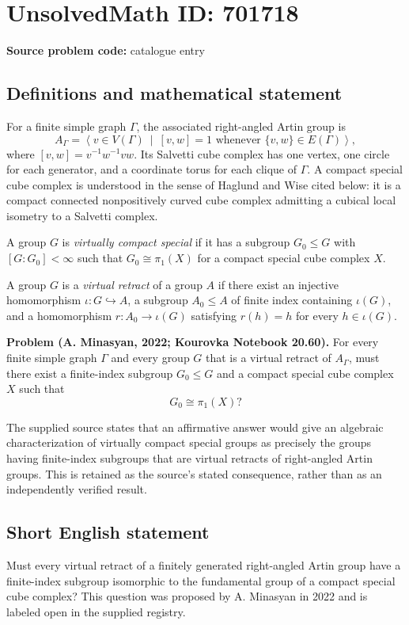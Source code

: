 \documentclass[11pt]{article}
\begin{document}
\section*{UnsolvedMath ID: 701718}
\textbf{Source problem code:} catalogue entry
\subsection{Definitions and mathematical statement}
For a finite simple graph \(\Gamma\), the associated right-angled Artin group is
\[
A_\Gamma=\left\langle v\in V(\Gamma)\ \middle|\ [v,w]=1\text{ whenever }\{v,w\}\in E(\Gamma)\right\rangle,
\]
where \([v,w]=v^{-1}w^{-1}vw\). Its Salvetti cube complex has one vertex, one circle for each generator, and a coordinate torus for each clique of \(\Gamma\). A compact special cube complex is understood in the sense of Haglund and Wise cited below: it is a compact connected nonpositively curved cube complex admitting a cubical local isometry to a Salvetti complex.

A group \(G\) is \emph{virtually compact special} if it has a subgroup \(G_0\leq G\) with \([G:G_0]<\infty\) such that \(G_0\cong\pi_1(X)\) for a compact special cube complex \(X\).

A group \(G\) is a \emph{virtual retract} of a group \(A\) if there exist an injective homomorphism \(\iota:G\hookrightarrow A\), a subgroup \(A_0\leq A\) of finite index containing \(\iota(G)\), and a homomorphism \(r:A_0\to\iota(G)\) satisfying \(r(h)=h\) for every \(h\in\iota(G)\).

\textbf{Problem (A. Minasyan, 2022; Kourovka Notebook 20.60).} For every finite simple graph \(\Gamma\) and every group \(G\) that is a virtual retract of \(A_\Gamma\), must there exist a finite-index subgroup \(G_0\leq G\) and a compact special cube complex \(X\) such that
\[
G_0\cong\pi_1(X)?
\]

The supplied source states that an affirmative answer would give an algebraic characterization of virtually compact special groups as precisely the groups having finite-index subgroups that are virtual retracts of right-angled Artin groups. This is retained as the source's stated consequence, rather than as an independently verified result.
\subsection{Short English statement}
Must every virtual retract of a finitely generated right-angled Artin group have a finite-index subgroup isomorphic to the fundamental group of a compact special cube complex? This question was proposed by A. Minasyan in 2022 and is labeled open in the supplied registry.
\end{document}
